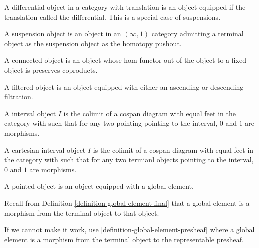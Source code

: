 \begin{definition}
    \label{definition-differential-object}
    A differential object in a category with translation is an object equipped if the translation called the differential. This is a special case of suspensions.
\end{definition}

\begin{definition}
    \label{definition-suspension-object}
    A suspension object is an object in an $(\infty,1)$ category admitting a terminal object as the suspension object as the homotopy pushout.
\end{definition}

\begin{definition}
    \label{definition-connected-object}
    A connected object is an object whose hom functor out of the object to a fixed object is preserves coproducts.
\end{definition}

\begin{definition}
    \label{definition-filtered-object}
    A filtered object is an object equipped with either an ascending or descending filtration.
\end{definition}

\begin{definition}
    \label{definition-interval-object}
    A interval object $I$ is the colimit of a cospan diagram with equal feet in the category with such that for any
    two pointing pointing to the interval, $0$ and $1$ are morphisms.
\end{definition}

\begin{definition}
    \label{definition-cartesian-interval-object}
    A cartesian interval object $I$ is the colimit of a cospan diagram with equal feet in the category with such that for any two termianl objects pointing to the interval, $0$ and $1$ are morphisms.
\end{definition}

\begin{definition}
    \label{definition-pointed-object}
    A pointed object is an object equipped with a global element.

    Recall from Definition \ref{definition-global-element-final} that a global element is a morphism from the terminal object to that object.

    If we cannot make it work, use \ref{definition-global-element-presheaf} where a global element is a morphism from the terminal object to the representable presheaf.
\end{definition}

